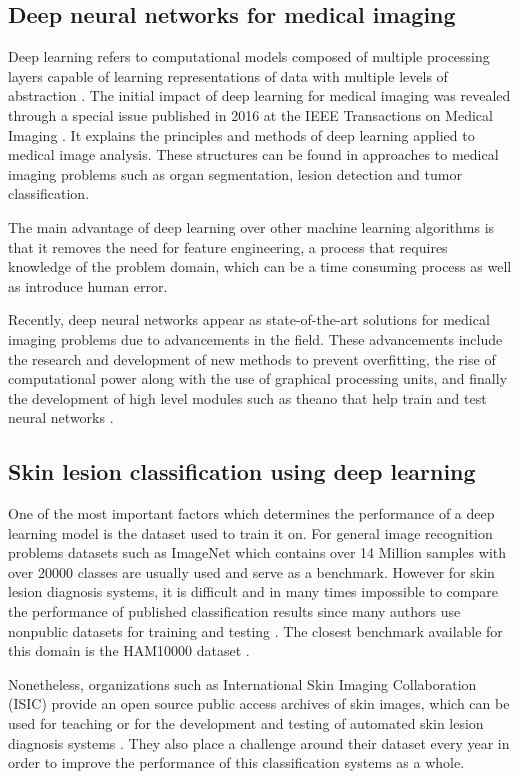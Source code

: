 \documentclass[journal,compsoc]{IEEEtran}
\begin{document}
\subsection{Deep neural networks for medical imaging}
Deep learning refers to computational models composed of multiple processing layers capable of learning representations of data with multiple levels of abstraction \cite{Goodfellow-et-al-2016}. The initial impact of deep learning for medical imaging was revealed through a special issue published in 2016 at the IEEE Transactions on Medical Imaging \cite{Greenspan2016}. It explains the principles and methods of deep learning applied to medical image analysis. These structures can be found in approaches to medical imaging problems such as organ segmentation, lesion detection and tumor classification. \par
The main advantage of deep learning over other machine learning algorithms is that it removes the need for feature engineering, a process that requires knowledge of the problem domain, which can be a time consuming process as well as introduce human error.\par
Recently, deep neural networks appear as state-of-the-art solutions for medical imaging problems due to advancements in the field. These advancements include the research and development of new methods to prevent overfitting, the rise of computational power along with the use of graphical processing units, and finally the development of high level modules such as theano \cite{Bastien} that help train and test neural networks . 
\subsection{Skin lesion classification using deep learning}
One of the most important factors which determines the performance of a deep learning model is the dataset used to train it on. For general image recognition problems datasets such as ImageNet \cite{Deng2010} which contains over 14 Million samples with over 20000 classes are usually used and serve as a benchmark. However for skin lesion diagnosis systems, it is difficult and in many times impossible to compare the performance of published classification results since many authors use nonpublic datasets for training and testing \cite{Brinker2018}. The closest benchmark available for this domain is the HAM10000 dataset \cite{ham10000}. \par
Nonetheless, organizations such as International Skin Imaging Collaboration (ISIC) provide an open source public access archives of skin images, which can be used for teaching or for the development and testing of automated skin lesion diagnosis systems \cite{isic2019}. They also place a challenge around their dataset every year in order to improve the performance of this classification systems as a whole. \par
\end{document}
